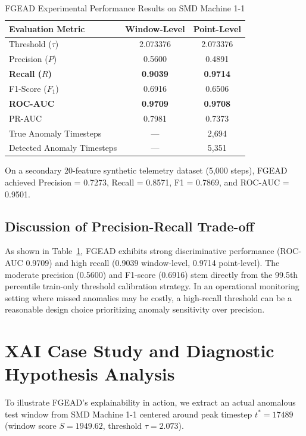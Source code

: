 \documentclass[conference]{IEEEtran}
\begin{document}
\begin{table}[h]
\caption{FGEAD Experimental Performance Results on SMD Machine 1-1}
\label{tab:smd_results}
\centering
\begin{tabular}{lcc}
\toprule
\textbf{Evaluation Metric} & \textbf{Window-Level} & \textbf{Point-Level} \\
\midrule
Threshold ($\tau$) & 2.073376 & 2.073376 \\
Precision ($P$) & 0.5600 & 0.4891 \\
\textbf{Recall ($R$)} & \textbf{0.9039} & \textbf{0.9714} \\
F1-Score ($F_1$) & 0.6916 & 0.6506 \\
\textbf{ROC-AUC} & \textbf{0.9709} & \textbf{0.9708} \\
PR-AUC & 0.7981 & 0.7373 \\
True Anomaly Timesteps & — & 2,694 \\
Detected Anomaly Timesteps & — & 5,351 \\
\bottomrule
\end{tabular}
\end{table}

On a secondary 20-feature synthetic telemetry dataset (5,000 steps), FGEAD achieved Precision = 0.7273, Recall = 0.8571, F1 = 0.7869, and ROC-AUC = 0.9501.

\subsection{Discussion of Precision-Recall Trade-off}
As shown in Table~\ref{tab:smd_results}, FGEAD exhibits strong discriminative performance (ROC-AUC 0.9709) and high recall (0.9039 window-level, 0.9714 point-level). The moderate precision (0.5600) and F1-score (0.6916) stem directly from the 99.5th percentile train-only threshold calibration strategy. In an operational monitoring setting where missed anomalies may be costly, a high-recall threshold can be a reasonable design choice prioritizing anomaly sensitivity over precision.

\section{XAI Case Study and Diagnostic Hypothesis Analysis}

To illustrate FGEAD's explainability in action, we extract an actual anomalous test window from SMD Machine 1-1 centered around peak timestep $t^* = 17489$ (window score $S = 1949.62$, threshold $\tau = 2.073$).
\end{document}
